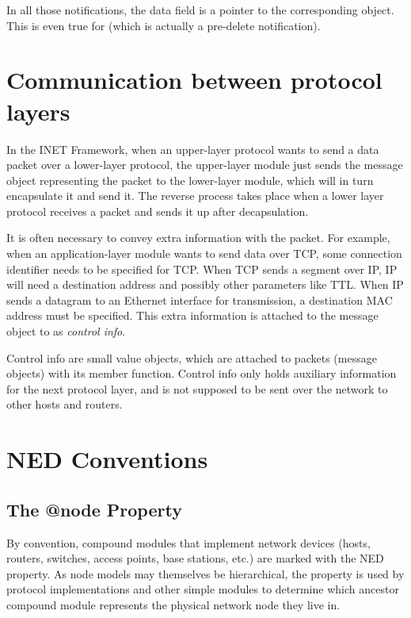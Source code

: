 In all those notifications, the data field is a pointer to the
corresponding  object. This is even true for
 (which is actually a pre-delete notification).
\fi


\section{Communication between protocol layers}

In the INET Framework, when an upper-layer protocol wants to send a data
packet over a lower-layer protocol, the upper-layer module just sends the
message object representing the packet to the lower-layer module, which
will in turn encapsulate it and send it. The reverse process takes place
when a lower layer protocol receives a packet and sends it up after
decapsulation.

It is often necessary to convey extra information with the packet. For
example, when an application-layer module wants to send data over TCP, some
connection identifier needs to be specified for TCP. When TCP sends a
segment over IP, IP will need a destination address and possibly other
parameters like TTL. When IP sends a datagram to an Ethernet interface for
transmission, a destination MAC address must be specified. This extra
information is attached to the message object to as \textit{control info}.

Control info are small value objects, which are attached to packets
(message objects) with its  member function.
Control info only holds auxiliary information for the next protocol layer,
and is not supposed to be sent over the network to other hosts and routers.


\section{NED Conventions}

\subsection{The @node Property}

By convention, compound modules that implement network devices (hosts,
routers, switches, access points, base stations, etc.) are marked with the
 NED property. As node models may themselves be hierarchical, the
 property is used by protocol implementations and other simple
modules to determine which ancestor compound module represents the physical
network node they live in.


